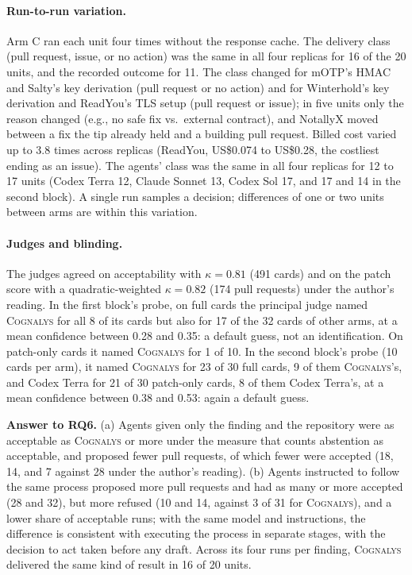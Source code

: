\documentclass[conference]{IEEEtran}
\newcommand{\system}{\textsc{Cognalys}}
\newcommand{\researchq}[1]{\textbf{RQ#1}}
\begin{document}
\paragraph{Run-to-run variation.} Arm C ran each unit four times without the
response cache. The delivery class (pull request, issue, or no action) was the
same in all four replicas for 16 of the 20 units, and the recorded outcome for
11. The class changed for mOTP's HMAC and Salty's key derivation (pull request
or no action) and for Winterhold's key derivation and ReadYou's TLS setup (pull
request or issue); in five units only the reason changed (e.g., no safe fix vs.\
external contract), and NotallyX moved between a fix the tip already held and a
building pull request. Billed cost varied up to 3.8 times across replicas
(ReadYou, US\$0.074 to US\$0.28, the costliest ending as an issue).
The agents' class was the same in all four replicas for 12 to 17 units
(Codex Terra 12, Claude Sonnet 13, Codex Sol 17, and 17 and 14 in the second
block). A single run samples a
decision; differences of one or two units between arms are within this
variation.

\paragraph{Judges and blinding.} The judges agreed on acceptability with
$\kappa = 0.81$ (491 cards) and on the patch score with a quadratic-weighted
$\kappa = 0.82$ (174 pull requests) under the author's reading. In the first block's probe,
on full cards the principal judge named \system{} for all 8 of its cards but
also for 17 of the 32 cards of other arms, at a mean confidence between 0.28
and 0.35: a default guess, not an identification. On patch-only cards it named
\system{} for 1 of 10. In the second block's probe (10 cards per arm), it named \system{} for 23 of
30 full cards, 9 of them \system{}'s, and Codex Terra for 21 of 30 patch-only
cards, 8 of them Codex Terra's, at a mean confidence between 0.38 and 0.53:
again a default guess.

\textbf{Answer to \researchq{6}.} (a) Agents given only the finding and the
repository were as acceptable as \system{} or more under the measure that
counts abstention as acceptable, and proposed fewer pull requests, of which
fewer were accepted (18, 14, and 7 against 28 under the author's reading).
(b) Agents instructed to follow the same process proposed more pull requests
and had as many or more accepted (28 and 32), but more refused (10 and 14,
against 3 of 31 for \system{}), and a lower share of acceptable runs; with the
same model and instructions, the difference is consistent with executing the
process in separate stages, with the decision to act taken before any draft.
Across its four runs per finding, \system{} delivered the same kind of result
in 16 of 20 units.
\end{document}
